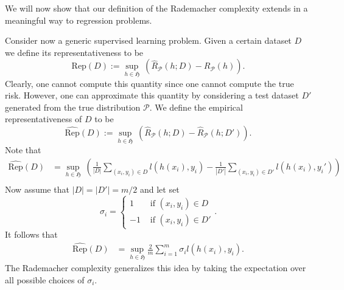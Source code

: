 We will now show that our definition of the Rademacher complexity extends in a
meaningful way to regression
problems. 

Consider now a generic
supervised learning problem. Given a certain dataset $D$ we define its
representativeness to be
$$
\text{Rep}(D) := \sup_{h \in \mathfrak{H}} \ (\hat{R}_\mathcal{P}(h;D) - R_\mathcal{P}(h)).
$$
Clearly, one cannot compute this quantity since one cannot compute the true
risk. However, one can approximate this quantity by considering a test dataset
$D'$ generated from the true distribution $\mathcal{P}$. We define the empirical
representativeness of $D$ to be 
$$
\hat{\text{Rep}}(D) := \sup_{h \in \mathfrak{H}} \ (\hat{R}_\mathcal{P}(h;D) - \hat{R}_{\mathcal{P}}(h;D')).
$$
Note that 
\begin{align*}
	\hat{\text{Rep}}(D) &= \sup_{h \in \mathfrak{H}} \ (  \frac{1}{|D|} \sum_{(x_i, y_i) \in D} l(h(x_i), y_i) - \frac{1}{|D'|} \sum_{(x_i, y_i) \in D'} l(h(x_i), y_i'))\\
\end{align*}
Now assume that $|D|=|D'|=m/2$ and let set 
\begin{equation*}
	\sigma_i= \begin{cases}
		1 & \text{ if } (x_i, y_i) \in D\\
		-1 & \text{ if } (x_i, y_i) \in D'
	\end{cases}.
\end{equation*}
It follows that 
\begin{align*}
	\hat{\text{Rep}}(D) 
	&= \sup_{h \in \mathfrak{H}} \frac{2}{m} \sum_{i=1}^{m} \sigma_i l(h(x_i), y_i).
\end{align*}
The Rademacher complexity generalizes this idea by taking the expectation over all possible choices of $\sigma_i$.

